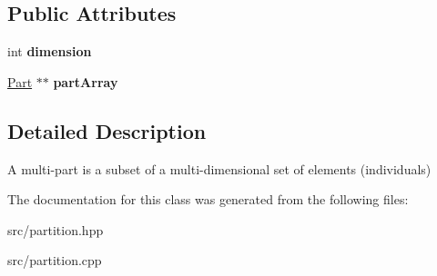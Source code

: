 \subsection*{Public Attributes}
\begin{DoxyCompactItemize}
\item 
\hypertarget{classMultiPart_a9ec48eb39e06eff6209d36db3f39219e}{int {\bfseries dimension}}\label{classMultiPart_a9ec48eb39e06eff6209d36db3f39219e}

\item 
\hypertarget{classMultiPart_a4d526314b79359136dc2c596c0615543}{\hyperlink{classPart}{Part} $\ast$$\ast$ {\bfseries part\-Array}}\label{classMultiPart_a4d526314b79359136dc2c596c0615543}

\end{DoxyCompactItemize}


\subsection{Detailed Description}
A multi-\/part is a subset of a multi-\/dimensional set of elements (individuals) 

The documentation for this class was generated from the following files\-:\begin{DoxyCompactItemize}
\item 
src/partition.\-hpp\item 
src/partition.\-cpp\end{DoxyCompactItemize}
